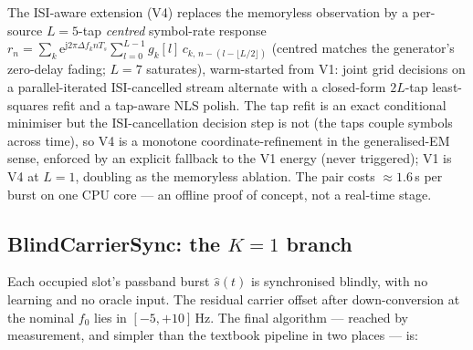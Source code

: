 \documentclass[journal]{IEEEtran}
\newcommand{\ee}{\mathrm{e}}
\newcommand{\jj}{\mathrm{j}}
\begin{document}
The ISI-aware extension (V4) replaces the memoryless observation by a
per-source $L{=}5$-tap \emph{centred} symbol-rate response
$r_n = \sum_k \ee^{\jj 2\pi \Delta f_k n T_s}
\sum_{l=0}^{L-1} g_k[l]\, c_{k,\, n-(l-\lfloor L/2 \rfloor)}$
(centred matches the generator's zero-delay fading; $L{=}7$
saturates), warm-started from V1: joint grid decisions on a
parallel-iterated ISI-cancelled stream alternate with a closed-form
$2L$-tap least-squares refit and a tap-aware NLS polish. The tap refit
is an exact conditional minimiser but the ISI-cancellation decision
step is not (the taps couple symbols across time), so V4 is a monotone
coordinate-refinement in the generalised-EM sense, enforced by an
explicit fallback to the V1 energy (never triggered); V1 is V4 at
$L{=}1$, doubling as the memoryless ablation. The pair costs
$\approx 1.6$\,s per burst on one CPU core --- an offline proof of
concept, not a real-time stage.

\subsection{BlindCarrierSync: the $K{=}1$ branch}
\label{sec:method-sync}

Each occupied slot's passband burst $\hat{s}(t)$ is synchronised
blindly, with no learning and no oracle input. The residual carrier
offset after down-conversion at the nominal $f_0$ lies in
$[-5, +10]$\,Hz. The final algorithm --- reached by measurement, and
simpler than the textbook pipeline in two places --- is:
\end{document}
